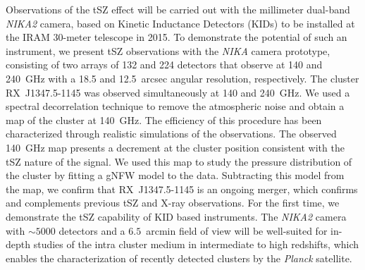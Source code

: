 {Observations of the tSZ effect will be carried out with the millimeter dual-band {\it NIKA2 }camera, based on Kinetic Inductance Detectors (KIDs) to be installed at the IRAM 30-meter telescope in 2015. To demonstrate the potential of such an instrument, we present tSZ observations with the {\it NIKA }camera prototype, consisting of two arrays of 132 and 224 detectors that observe at 140 and 240~GHz with a 18.5 and 12.5~arcsec angular resolution, respectively.} 
{The cluster \mbox{RX~J1347.5-1145} was observed simultaneously at 140 and 240~GHz. We used a spectral decorrelation technique to remove the atmospheric noise and obtain a map of the cluster at 140~GHz. The efficiency of this procedure has been characterized through realistic simulations of the observations.}
{The observed 140~GHz map presents a decrement at the cluster position consistent with the tSZ nature of the signal. We used this map to study the pressure distribution of the cluster by fitting a gNFW model to the data. Subtracting this model from the map, we confirm that \mbox{RX~J1347.5-1145} is an ongoing merger, which confirms and complements previous tSZ and X-ray observations.}
{For the first time, we demonstrate the tSZ capability of KID based instruments. The {\it NIKA2 }camera with $\sim 5000$ detectors and a $6.5$~arcmin field of view will be well-suited for in-depth studies of the intra cluster medium in intermediate to high redshifts, which enables the characterization of  recently detected clusters by the {\it Planck }satellite.}
